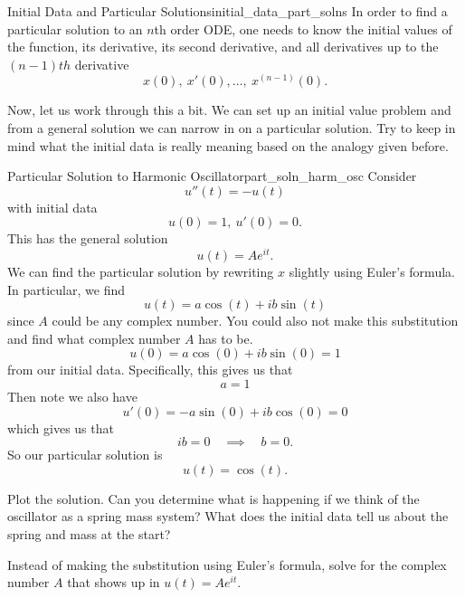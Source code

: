        \begin{prop}{Initial Data and Particular Solutions}{initial_data_part_solns}
        In order to find a particular solution to an $n$th order ODE, one needs to know the initial values of the function, its derivative, its second derivative, and all derivatives up to the $(n-1)th$ derivative
        \[
        x(0),~ x'(0),\dots,~ x^{(n-1)}(0).
        \]
        \end{prop}

        \noindent Now, let us work through this a bit.  We can set up an initial value problem and from a general solution we can narrow in on a particular solution.  Try to keep in mind what the initial data is really meaning based on the analogy given before.


        \begin{ex}{Particular Solution to Harmonic Oscillator}{part_soln_harm_osc}
        Consider
        \[
        u''(t)=-u(t)
        \]
        with initial data
        \[
        u(0)=1, ~ u'(0)=0.
        \]
        This has the general solution
        \[
        u(t)=Ae^{it}.
        \]
        We can find the particular solution by rewriting $x$ slightly using Euler's formula. In particular, we find
        \[
        u(t)=a\cos(t)+ib\sin(t)
        \]
        since $A$ could be any complex number.  You could also not make this substitution and find what complex number $A$ has to be.
        \[
        u(0)=a\cos(0)+ib\sin(0)=1
        \]
        from our initial data.  Specifically, this gives us that
        \[
        a=1
        \]
        Then note we also have
        \[
        u'(0)=-a\sin (0) +i b\cos (0)=0
        \]
        which gives us that
        \[
        ib=0 \quad \implies \quad b=0.
        \]
        So our particular solution is
        \[
        u(t)=\cos (t).
        \]
        \end{ex}

        \begin{exercise}
        Plot the solution. Can you determine what is happening if we think of the oscillator as a spring mass system? What does the initial data tell us about the spring and mass at the start?
        \end{exercise}

        \begin{exercise}
            Instead of making the substitution using Euler's formula, solve for the complex number $A$ that shows up in $u(t)=Ae^{it}$.
        \end{exercise}

